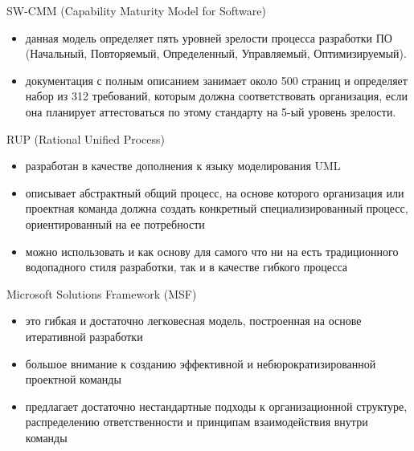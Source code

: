 \documentclass{beamer}
\begin{document}
\begin{frame}[t]
SW-CMM (Capability Maturity Model for Software)
\begin{itemize}
\item данная модель определяет пять уровней зрелости процесса разработки ПО (Начальный, Повторяемый, Определенный, Управляемый, Оптимизируемый).
\item документация с полным описанием занимает около 500 страниц и определяет набор из 312 требований, которым должна соответствовать организация, если она планирует аттестоваться по этому стандарту на 5-ый уровень зрелости.
\end{itemize}
\end{frame}

\begin{frame}[t]
RUP (Rational Unified Process)
\begin{itemize}
\item разработан в качестве дополнения к языку моделирования UML
\item описывает абстрактный общий процесс, на основе которого организация или проектная команда должна
создать конкретный специализированный процесс, ориентированный на ее потребности
\item можно использовать и как основу для самого что ни на есть традиционного водопадного стиля разработки, так и в качестве гибкого процесса
\end{itemize}
\end{frame}

\begin{frame}[t]
Microsoft Solutions Framework (MSF)
\begin{itemize}
\item это гибкая и достаточно легковесная модель, построенная на основе итеративной разработки
\item большое внимание к созданию эффективной и небюрократизированной проектной команды
\item предлагает достаточно нестандартные подходы к организационной структуре, распределению ответственности и принципам взаимодействия внутри команды
\end{itemize}
\end{frame}
\end{document}
